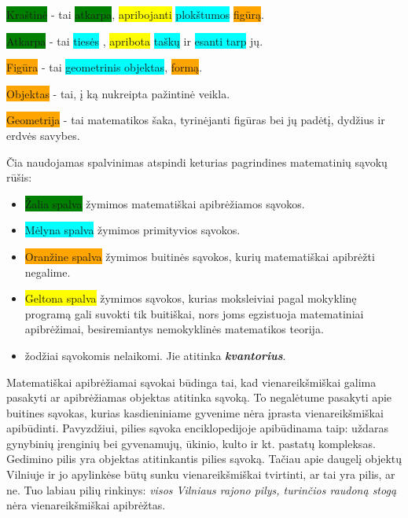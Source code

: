 \documentclass{article}
\begin{document}
\colorbox{green}{Kraštinė} - tai \colorbox{green}{atkarpa}, \colorbox{yellow}{apribojanti} \colorbox{cyan}{plokštumos} \colorbox{orange}{figūrą}.

\colorbox{green}{Atkarpa} - tai \colorbox{cyan}{tiesės} , \colorbox{yellow}{apribota}  \colorbox{cyan}{taškų} ir \colorbox{cyan}{esanti tarp} jų.

\colorbox{orange}{Figūra} - tai \colorbox{cyan}{geometrinis objektas},  \colorbox{orange}{formą}.

\colorbox{orange}{Objektas} - tai, į ką nukreipta pažintinė veikla.

\colorbox{orange}{Geometrija} - tai matematikos šaka, tyrinėjanti figūras bei jų padėtį, dydžius ir erdvės savybes.
\newline

Čia naudojamas spalvinimas atspindi keturias pagrindines matematinių sąvokų rūšis:
\begin{itemize}
\item \colorbox{green}{Žalia spalva} žymimos matematiškai apibrėžiamos sąvokos.
\item \colorbox{cyan}{Mėlyna spalva} žymimos primityvios sąvokos.
\item \colorbox{orange}{Oranžine spalva} žymimos buitinės sąvokos, kurių matematiškai apibrėžti negalime.
\item \colorbox{yellow}{Geltona spalva} žymimos sąvokos, kurias moksleiviai pagal mokyklinę programą gali suvokti tik buitiškai, nors joms egzistuoja matematiniai apibrėžimai, besiremiantys nemokyklinės matematikos teorija. 
\item {} žodžiai sąvokomis nelaikomi. Jie atitinka \textbf{\textit{kvantorius}}.
\end{itemize}

Matematiškai apibrėžiamai sąvokai būdinga tai, kad vienareikšmiškai galima pasakyti ar apibrėžiamas objektas atitinka sąvoką. To negalėtume pasakyti apie buitines sąvokas, kurias kasdieniniame gyvenime nėra įprasta vienareikšmiškai apibūdinti. Pavyzdžiui, pilies sąvoka enciklopedijoje apibūdinama taip: uždaras gynybinių įrenginių bei gyvenamujų, ūkinio, kulto ir kt. pastatų kompleksas. Gedimino pilis yra objektas atitinkantis pilies sąvoką. Tačiau apie daugelį objektų Vilniuje ir jo apylinkėse būtų sunku vienareikšmiškai tvirtinti, ar tai yra pilis, ar ne. Tuo labiau pilių rinkinys: \textit{visos Vilniaus rajono pilys, turinčios raudoną stogą} nėra vienareikšmiškai apibrėžtas. 
\end{document}
